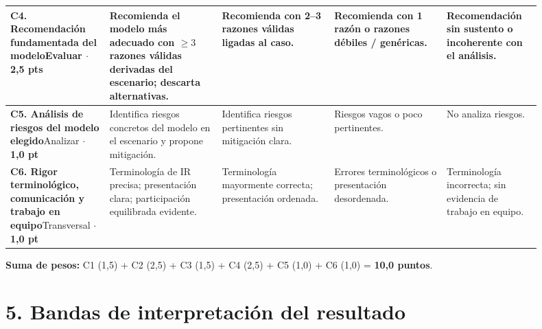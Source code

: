 \documentclass[11pt]{article}
\begin{document}
\begin{landscape}
\begin{longtable}{|L{0.165\linewidth}|L{0.19\linewidth}|L{0.19\linewidth}|L{0.19\linewidth}|L{0.165\linewidth}|}
\textbf{C4. Recomendación fundamentada del modelo}\newline{}Evaluar $\cdot$ \textbf{2,5 pts} &
Recomienda el modelo más adecuado con $\geq 3$ razones válidas derivadas del escenario; descarta alternativas. &
Recomienda con 2--3 razones válidas ligadas al caso. &
Recomienda con 1 razón o razones débiles / genéricas. &
Recomendación sin sustento o incoherente con el análisis.\\
\hline

\textbf{C5. Análisis de riesgos del modelo elegido}\newline{}Analizar $\cdot$ \textbf{1,0 pt} &
Identifica riesgos concretos del modelo en el escenario y propone mitigación. &
Identifica riesgos pertinentes sin mitigación clara. &
Riesgos vagos o poco pertinentes. &
No analiza riesgos.\\
\hline

\textbf{C6. Rigor terminológico, comunicación y trabajo en equipo}\newline{}Transversal $\cdot$ \textbf{1,0 pt} &
Terminología de IR precisa; presentación clara; participación equilibrada evidente. &
Terminología mayormente correcta; presentación ordenada. &
Errores terminológicos o presentación desordenada. &
Terminología incorrecta; sin evidencia de trabajo en equipo.\\
\hline
\end{longtable}

\noindent\textbf{Suma de pesos:} C1 (1,5) + C2 (2,5) + C3 (1,5) + C4 (2,5) + C5 (1,0) + C6 (1,0) = \textbf{10,0 puntos}.
\end{landscape}

\section*{\textcolor{utegreendk}{5. Bandas de interpretación del resultado}}
\end{document}
